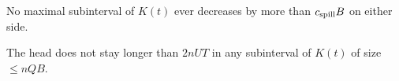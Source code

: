 \documentclass[11pt]{memoir}
\theoremstyle{definition} %
\renewcommand{\le}{\leq}
\def\B{B}
\def\U{U}
\newcommand{\Int}{\mathrm{Int}} %
\newcommand{\Q}{Q} %
\newcommand{\Tu}{T}
\newcommand{\Z}{Z} %
\newcommand{\cns}[1]{c_{\textrm{\upshape #1}}}
\newcommand{\CMarg}{\cns{marg}}
\newcommand{\CShort}{\cns{short}}
\newcommand{\CSpill}{\cns{spill}}
\begin{document}
\begin{lemma}\label{lem:escape.inside-hole}
 \begin{alphenum}
 \item\label{i:escape.no-spill} No maximal subinterval of \( K(t) \) ever
   decreases by more than \( \CSpill\B \) on either side. 
\item\label{i:escape.long-stay}
  The head does not stay longer than \( 2 n\U\Tu \) in any subinterval of  \( K(t) \) of size
  \( \le n\Q\B \).
  \end{alphenum}
\end{lemma}
\end{document}
